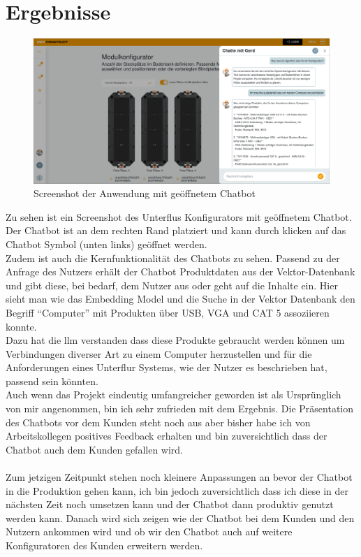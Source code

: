 \chapter{Ergebnisse}\label{ch:ergebnisse}
\begin{figure}[H]
    \begin{center}
        \includegraphics[width=14cm]{bilder/chatbot.png}
        \caption{Screenshot der Anwendung mit geöffnetem Chatbot}\label{fig:bodentank}
    \end{center}
\end{figure}
Zu sehen ist ein Screenshot des Unterflus Konfigurators mit geöffnetem Chatbot.
Der Chatbot ist an dem rechten Rand platziert und kann durch klicken auf das Chatbot Symbol (unten links) geöffnet werden.\\
Zudem ist auch die Kernfunktionalität des Chatbots zu sehen. Passend zu der Anfrage des Nutzers erhält der Chatbot Produktdaten aus der
Vektor-Datenbank und gibt diese, bei bedarf, dem Nutzer aus oder geht auf die Inhalte ein.
Hier sieht man wie das Embedding Model und die Suche in der Vektor Datenbank den Begriff \enquote{Computer} mit Produkten über USB, VGA und CAT 5
assoziieren konnte.\\
Dazu hat die \gls{llm} verstanden dass diese Produkte gebraucht werden können um Verbindungen diverser Art zu einem Computer herzustellen
und für die Anforderungen eines Unterflur Systems, wie der Nutzer es beschrieben hat, passend sein könnten.\\
Auch wenn das Projekt eindeutig umfangreicher geworden ist als Ursprünglich von mir angenommen, bin ich sehr zufrieden mit dem Ergebnis.
Die Präsentation des Chatbots vor dem Kunden steht noch aus aber bisher habe ich von Arbeitskollegen positives Feedback erhalten 
und bin zuversichtlich dass der Chatbot auch dem Kunden gefallen wird.\\\\
Zum jetzigen Zeitpunkt stehen noch kleinere Anpassungen an bevor der Chatbot in die Produktion gehen kann, ich bin jedoch zuversichtlich
dass ich diese in der nächsten Zeit noch umsetzen kann und der Chatbot dann produktiv genutzt werden kann.
Danach wird sich zeigen wie der Chatbot bei dem Kunden und den Nutzern ankommen wird und ob wir den Chatbot auch auf weitere Konfiguratoren
des Kunden erweitern werden.